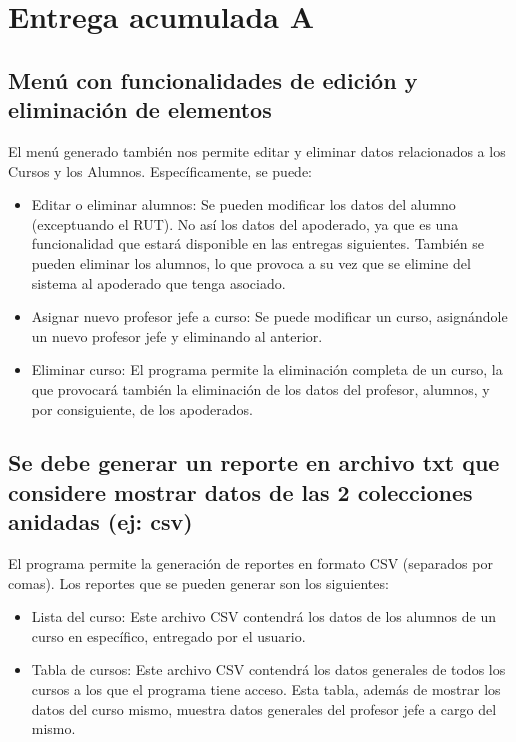 \renewcommand\thesection{\Alph{section}}
\renewcommand\thesubsection{\thesection.\arabic{subsection}}
\setcounter{section}{0}
\section{Entrega acumulada A}

\setcounter{subsection}{1}
\subsection{Menú con funcionalidades de edición y eliminación de elementos}

El menú generado también nos permite editar y eliminar datos relacionados a los Cursos y los Alumnos. Específicamente, se puede:

\begin{itemize}
    \item Editar o eliminar alumnos: Se pueden modificar los datos del alumno (exceptuando el RUT). No así los datos del apoderado, ya que es una funcionalidad que estará disponible en las entregas siguientes. También se pueden eliminar los alumnos, lo que provoca a su vez que se elimine del sistema al apoderado que tenga asociado.
    \item Asignar nuevo profesor jefe a curso: Se puede modificar un curso, asignándole un nuevo profesor jefe y eliminando al anterior.
    \item Eliminar curso: El programa permite la eliminación completa de un curso, la que provocará también la eliminación de los datos del profesor, alumnos, y por consiguiente, de los apoderados.
\end{itemize}

\subsection{Se debe generar un reporte en archivo txt que considere mostrar datos de las 2 colecciones anidadas (ej: csv)}

El programa permite la generación de reportes en formato CSV (separados por comas). Los reportes que se pueden generar son los siguientes:

\begin{itemize}
    \item Lista del curso: Este archivo CSV contendrá los datos de los alumnos de un curso en específico, entregado por el usuario.
    \item Tabla de cursos: Este archivo CSV contendrá los datos generales de todos los cursos a los que el programa tiene acceso. Esta tabla, además de mostrar los datos del curso mismo, muestra datos generales del profesor jefe a cargo del mismo.
\end{itemize}

